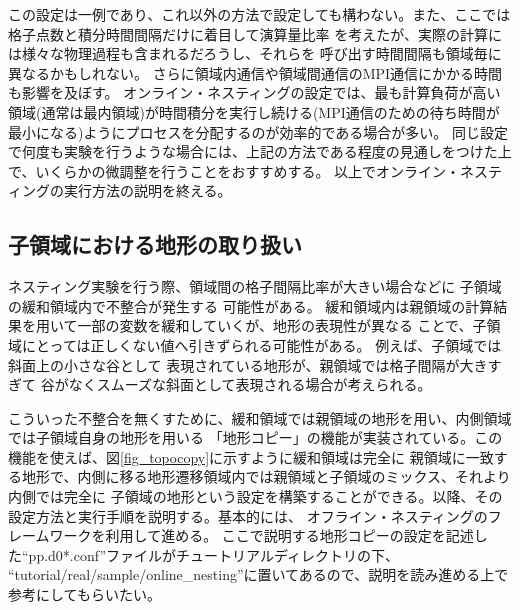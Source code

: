 この設定は一例であり、これ以外の方法で設定しても構わない。また、ここでは格子点数と積分時間間隔だけに着目して演算量比率
を考えたが、実際の計算には様々な物理過程も含まれるだろうし、それらを 呼び出す時間間隔も領域毎に異なるかもしれない。
さらに領域内通信や領域間通信のMPI通信にかかる時間も影響を及ぼす。
オンライン・ネスティングの設定では、最も計算負荷が高い領域(通常は最内領域)が時間積分を実行し続ける(MPI通信のための待ち時間が最小になる)ようにプロセスを分配するのが効率的である場合が多い。
同じ設定で何度も実験を行うような場合には、上記の方法である程度の見通しをつけた上で、いくらかの微調整を行うことをおすすめする。
以上でオンライン・ネスティングの実行方法の説明を終える。


\subsection{子領域における地形の取り扱い} \label{subsec:nest_topo}
ネスティング実験を行う際、領域間の格子間隔比率が大きい場合などに
子領域の緩和領域内で不整合が発生する
可能性がある。
緩和領域内は親領域の計算結果を用いて一部の変数を緩和していくが、地形の表現性が異なる
ことで、子領域にとっては正しくない値へ引きずられる可能性がある。
例えば、子領域では斜面上の小さな谷として
表現されている地形が、親領域では格子間隔が大きすぎて
谷がなくスムーズな斜面として表現される場合が考えられる。

こういった不整合を無くすために、緩和領域では親領域の地形を用い、内側領域では子領域自身の地形を用いる
「地形コピー」の機能が実装されている。この機能を使えば、図\ref{fig_topocopy}に示すように緩和領域は完全に
親領域に一致する地形で、内側に移る地形遷移領域内では親領域と子領域のミックス、それより内側では完全に
子領域の地形という設定を構築することができる。以降、その設定方法と実行手順を説明する。基本的には、
オフライン・ネスティングのフレームワークを利用して進める。
ここで説明する地形コピーの設定を記述した``pp.d0*.conf''ファイルがチュートリアルディレクトリの下、
``tutorial/real/sample/online\_nesting''に置いてあるので、説明を読み進める上で参考にしてもらいたい。

